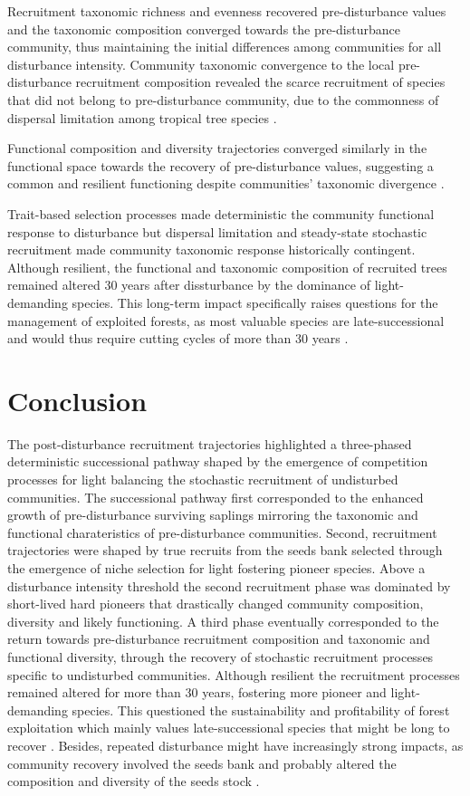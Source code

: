 \documentclass[fleqn,10pt]{ArtEcoFoG} %
\begin{document}
Recruitment taxonomic richness and evenness recovered pre-disturbance
values and the taxonomic composition converged towards the
pre-disturbance community, thus maintaining the initial differences
among communities for all disturbance intensity. Community taxonomic
convergence to the local pre-disturbance recruitment composition revealed the scarce recruitment of species that did not
belong to pre-disturbance community, due to the commonness of dispersal
limitation among tropical tree species \citep{Svenning2005}.

Functional composition and diversity trajectories converged similarly in
the functional space towards the recovery of pre-disturbance values,
suggesting a common and resilient functioning despite communities'
taxonomic divergence \citep{Fukami2005}.

Trait-based selection processes made deterministic the community
functional response to disturbance but dispersal limitation and
steady-state stochastic recruitment made community taxonomic response
historically contingent. Although resilient, the functional and
taxonomic composition of recruited trees remained altered 30 years after
dissturbance by the dominance of light-demanding species. This long-term
impact specifically raises questions for the management of exploited
forests, as most valuable species are late-successional and would thus
require cutting cycles of more than 30 years \citep{Putz2012}.

\section{Conclusion}\label{conclusion}

The post-disturbance recruitment trajectories highlighted a three-phased
deterministic successional pathway shaped by the emergence of
competition processes for light balancing the stochastic recruitment of
undisturbed communities. The successional pathway first corresponded to
the enhanced growth of pre-disturbance surviving saplings mirroring the
taxonomic and functional charateristics of pre-disturbance communities.
Second, recruitment trajectories were shaped by true recruits from the
seeds bank selected through the emergence of niche selection for
light fostering pioneer species. Above a disturbance intensity threshold
the second recruitment phase was dominated by short-lived hard pioneers
that drastically changed community composition, diversity and likely
functioning. A third phase eventually corresponded to the return towards
pre-disturbance recruitment composition and taxonomic and functional
diversity, through the recovery of stochastic recruitment processes
specific to undisturbed communities. Although resilient the recruitment
processes remained altered for more than 30 years, fostering more
pioneer and light-demanding species. This questioned the sustainability
and profitability of forest exploitation which mainly values
late-successional species that might be long to recover
\citep{Putz2012}. Besides, repeated disturbance might have increasingly
strong impacts, as community recovery involved the seeds bank and
probably altered the composition and diversity of the seeds stock
\citep{Norden2009}.
\end{document}
